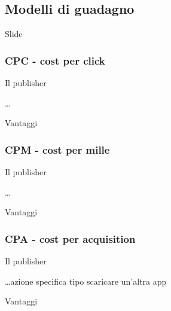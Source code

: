 \subsection{Modelli di guadagno}
\par Slide

\subsubsection{CPC - cost per click}
\par Il publisher
\par \dots
\par Vantaggi

\subsubsection{CPM - cost per mille}
\par Il publisher
\par \dots
\par Vantaggi

\subsubsection{CPA - cost per acquisition}
\par Il publisher
\par \dots azione specifica tipo scaricare un'altra app
\par Vantaggi
